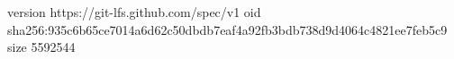 version https://git-lfs.github.com/spec/v1
oid sha256:935c6b65ce7014a6d62c50dbdb7eaf4a92fb3bdb738d9d4064c4821ee7feb5c9
size 5592544
